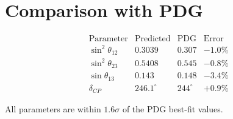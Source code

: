 \section{Comparison with PDG}

\[
\begin{array}{lccc}
\text{Parameter} & \text{Predicted} & \text{PDG} & \text{Error} \\
\hline
\sin^2\theta_{12} & 0.3039 & 0.307 & -1.0\% \\
\sin^2\theta_{23} & 0.5408 & 0.545 & -0.8\% \\
\sin\theta_{13} & 0.143 & 0.148 & -3.4\% \\
\delta_{CP} & 246.1^\circ & 244^\circ & +0.9\%
\end{array}
\]

All parameters are within \(1.6\sigma\) of the PDG best-fit values.
